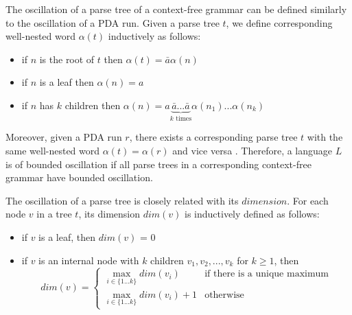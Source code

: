 \documentclass[11pt,a4paper]{article} %
\begin{document}
The oscillation of a parse tree of a context-free grammar can be defined similarly to the oscillation of a PDA run. Given a parse tree $t$, we define corresponding well-nested word $\alpha(t)$ inductively as follows:
\begin{itemize}
\item if $n$ is the root of $t$ then $\alpha(t) = \bar{a}\alpha(n)$
\item if $n$ is a leaf then $\alpha(n)=a$
\item if $n$ has $k$ children then $\alpha(n) = a\underbrace{\bar{a}...\bar{a}}_\text{$k$ times}\alpha(n_1)...\alpha(n_k)$
\end{itemize}


Moreover, given a PDA run $r$, there exists a corresponding parse tree $t$ with the same well-nested word $\alpha(t)=\alpha(r)$ and vice versa \cite{BoundOsc}. Therefore, a language $L$ is of bounded oscillation if all parse trees in a corresponding context-free grammar have bounded oscillation.


The oscillation of a parse tree is closely related with its $dimension$. For each node $v$ in a tree $t$, its dimension $dim(v)$ is inductively defined as follows:
\begin{itemize}
\item if $v$ is a leaf, then $dim(v)$ = 0
\item if $v$ is an internal node with $k$ children $v_1, v_2, ..., v_k$ for $k \ge 1$, then 
$$
dim(v) = 
 \begin{cases}
   \max_{i \in \{1...k\}}dim(v_i) &\text{if there is a unique maximum}\\
   \max_{i \in \{1...k\}}dim(v_i)+1 &\text{otherwise}
 \end{cases}
$$
\end{itemize}
\end{document}
